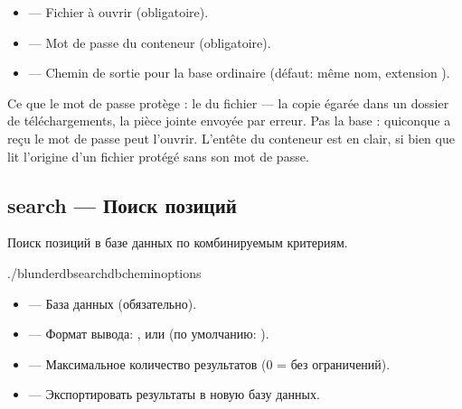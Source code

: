 \documentclass[letterpaper,10pt,russian]{sphinxmanual}
\begin{document}
\sphinxAtStartPar
{}
\begin{itemize}
\item {} 
\sphinxAtStartPar
{} — Fichier  à ouvrir (obligatoire).

\item {} 
\sphinxAtStartPar
{} — Mot de passe du conteneur (obligatoire).

\item {} 
\sphinxAtStartPar
{} — Chemin de sortie pour la base ordinaire (défaut: même nom,
extension ).

\end{itemize}

\sphinxAtStartPar
Ce que le mot de passe protège : le  du fichier — la copie égarée
dans un dossier de téléchargements, la pièce jointe envoyée par erreur. Pas la
base : quiconque a reçu le mot de passe peut l’ouvrir. L’en\sphinxhyphen{}tête du conteneur
est en clair, si bien que  lit l’origine d’un fichier
protégé sans son mot de passe.


\subsection{search — Поиск позиций}
\label{\detokenize{cli:search-rechercher-des-positions}}
\sphinxAtStartPar
Поиск позиций в базе данных по комбинируемым критериям.

\begin{sphinxVerbatim}[commandchars=\\\{\}]
./blunderdbsearch\PYGZhy{}\PYGZhy{}db\PYGZlt{}chemin\PYGZgt{}\PYG{o}{[}options\PYG{o}{]}
\end{sphinxVerbatim}

\sphinxAtStartPar
{}
\begin{itemize}
\item {} 
\sphinxAtStartPar
{} — База данных (обязательно).

\item {} 
\sphinxAtStartPar
{} — Формат вывода: ,  или  (по умолчанию: ).

\item {} 
\sphinxAtStartPar
{} — Максимальное количество результатов (0 = без ограничений).

\item {} 
\sphinxAtStartPar
{} — Экспортировать результаты в новую базу данных.

\end{itemize}
\end{document}
